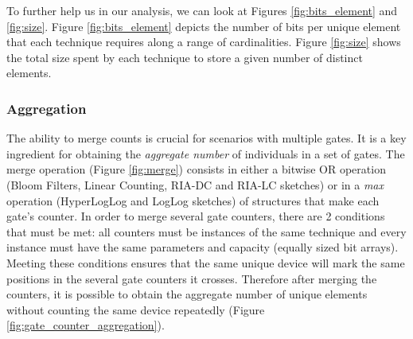 To further help us in our analysis, we can look at Figures
\ref{fig:bits_element} and \ref{fig:size}. Figure
\ref{fig:bits_element} depicts the number of bits per unique element
that each technique requires along a range of cardinalities. Figure
\ref{fig:size} shows the total size spent by each technique to store a
given number of distinct elements.

\subsubsection{Aggregation}
\label{sec:mergeAbility}

The ability to merge counts is crucial for scenarios with multiple
gates. It is a key ingredient for obtaining the \emph{aggregate
 number} of individuals in a set of gates. The merge operation
(Figure \ref{fig:merge}) consists in either a bitwise OR operation
(Bloom Filters, Linear Counting, RIA-DC and RIA-LC sketches) or in a
\emph{max} operation (HyperLogLog and LogLog sketches) of structures
that make each gate's counter. In order to merge several gate
counters, there are 2 conditions that must be met: all counters must
be instances of the same technique and every instance must have the
same parameters and capacity (equally sized bit arrays). Meeting these
conditions ensures that the same unique device will mark the same
positions in the several gate counters it crosses. Therefore after
merging the counters, it is possible to obtain the aggregate number of
unique elements without counting the same device repeatedly (Figure
\ref{fig:gate_counter_aggregation}).

